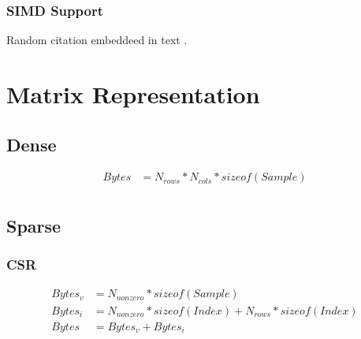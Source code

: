 \documentclass{report}
\begin{document}
\subsection{SIMD Support}

Random citation \cite{Wefers2014} embeddeed in \cite{Takahashi2019} text
\cite{Akujuobi2022}.

\chapter{Matrix Representation}

\section{Dense}

\begin{equation}
    \begin{split}
        Bytes & = N_{rows} * N_{cols} * sizeof(Sample) \\
    \end{split}
\end{equation}

\section{Sparse}

\subsection{CSR}

\begin{equation}
    \begin{split}
        Bytes_{v} & = N_{nonzero} * sizeof(Sample) \\
        Bytes_{i} & = N_{nonzero} * sizeof(Index) + N_{rows} * sizeof(Index) \\
        Bytes     & = Bytes_{v} + Bytes_{i} \\
    \end{split}
\end{equation}

\newpage


\end{document}
